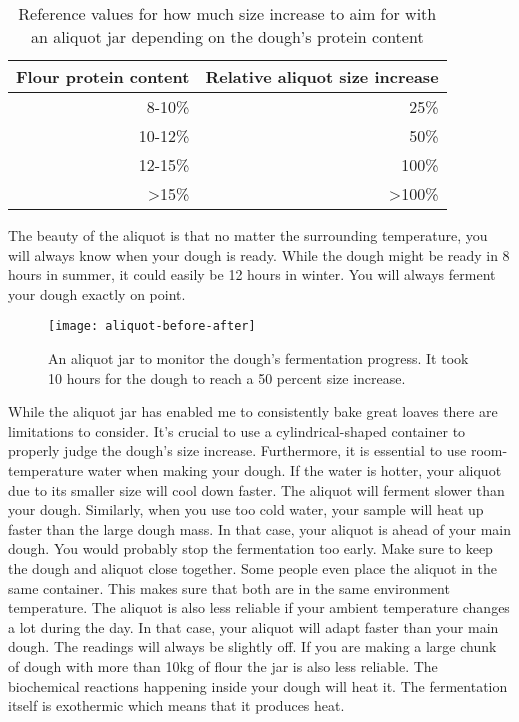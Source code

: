 \begin{table}[!htb]
  \begin{tabular}{|r|r|}
  \hline
  \multicolumn{1}{|l|}{\textbf{Flour protein content}} & \multicolumn{1}{l|}{\textbf{Relative aliquot size increase}} \\ \hline
  8-10\%                                               & 25\%                                                         \\ \hline
  10-12\%                                              & 50\%                                                         \\ \hline
  12-15\%                                              & 100\%                                                        \\ \hline
  \textgreater 15\%                                    & \textgreater 100\%                                           \\ \hline
  \end{tabular}
  \caption{Reference values for how much size increase to aim for with an aliquot jar depending on the dough's protein content}
\end{table}

The beauty of the aliquot is that no matter the surrounding
temperature, you will always know when your dough is ready.
While the dough might be ready in 8 hours in summer, it could
easily be 12 hours in winter. You will always ferment your
dough exactly on point.


\begin{figure}[!htb]
  \texttt{[image: aliquot-before-after]}
  \caption{An aliquot jar to monitor the dough's fermentation progress.
  It took 10 hours for the dough to reach a 50 percent size increase.}
\end{figure}

While the aliquot jar has enabled me to consistently bake
great loaves there are limitations to consider. It's crucial
to use a cylindrical-shaped container to properly judge
the dough's size increase. Furthermore, it is essential
to use room-temperature water when making your dough. If the
water is hotter, your aliquot due to its smaller size
will cool down faster. The aliquot will ferment slower
than your dough. Similarly, when you use too cold water,
your sample will heat up faster than the large dough mass.
In that case, your aliquot is ahead of your main dough. You
would probably stop the fermentation too early. Make sure
to keep the dough and aliquot close together. Some people even
place the aliquot in the same container. This makes sure that
both are in the same environment temperature. The aliquot
is also less reliable if your ambient temperature changes
a lot during the day. In that case, your aliquot will adapt
faster than your main dough. The readings will always be slightly
off. If you are making a large chunk of dough with more
than 10kg of flour the jar is also less reliable. The biochemical
reactions happening inside your dough will heat it.
The fermentation itself is exothermic which means
that it produces heat.

